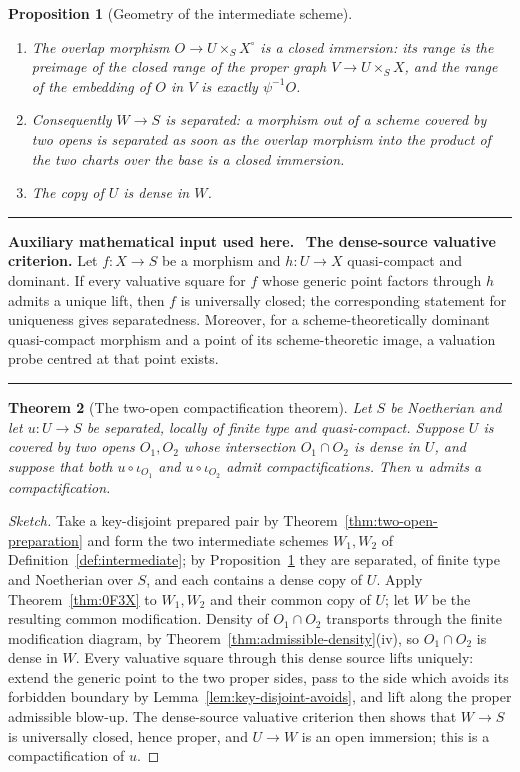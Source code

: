 \documentclass[11pt,a4paper]{article}
\theoremstyle{plain}
\newtheorem{theorem}{Theorem}[section]
\newtheorem{proposition}[theorem]{Proposition}
\theoremstyle{definition}
\theoremstyle{remark}
\newenvironment{auxinput}{%
  \par\medskip\begingroup\interlinepenalty=10000\relax
  \noindent\textcolor{orange!70!black}{\rule{\linewidth}{0.9pt}}%
  \par\nopagebreak\smallskip\noindent
  \textbf{Auxiliary mathematical input used here.}\ \ignorespaces}%
  {\par\nopagebreak\smallskip\nopagebreak\noindent
   \textcolor{orange!70!black}{\rule{\linewidth}{0.9pt}}\par\endgroup\medskip}
\begin{document}
\begin{proposition}[Geometry of the intermediate scheme]
\label{prop:intermediate}
\begin{enumerate}[label=\textup{(\roman*)}, itemsep=1pt]
\item The overlap morphism $O\to U\times_S X^{\circ}$ is a closed immersion:
      its range is the preimage of the closed range of the proper graph
      $V\to U\times_S X$, and the range of the embedding of $O$ in $V$ is
      exactly $\psi^{-1}O$.
\item Consequently $W\to S$ is separated: a morphism out of a scheme covered by
      two opens is separated as soon as the overlap morphism into the product of
      the two charts over the base is a closed immersion.
\item The copy of $U$ is dense in $W$.
\end{enumerate}
\end{proposition}

\begin{auxinput}
\textbf{The dense-source valuative criterion.} Let $f\colon X\to S$ be a
morphism and $h\colon U\to X$ quasi-compact and dominant. If every valuative
square for $f$ whose generic point factors through $h$ admits a unique lift,
then $f$ is universally closed; the corresponding statement for uniqueness
gives separatedness. Moreover, for a scheme-theoretically dominant
quasi-compact morphism and a point of its scheme-theoretic image, a valuation
probe centred at that point exists.
\end{auxinput}

\begin{theorem}[The two-open compactification theorem]
\label{thm:two-open}
Let $S$ be Noetherian and let $u\colon U\to S$ be separated, locally of finite
type and quasi-compact. Suppose $U$ is covered by two opens $O_1,O_2$ whose
intersection $O_1\cap O_2$ is dense in $U$, and suppose that both
$u\circ\iota_{O_1}$ and $u\circ\iota_{O_2}$ admit compactifications. Then $u$
admits a compactification.
\end{theorem}

\begin{proof}[Sketch]
Take a key-disjoint prepared pair by Theorem~\ref{thm:two-open-preparation} and
form the two intermediate schemes $W_1,W_2$ of Definition~\ref{def:intermediate};
by Proposition~\ref{prop:intermediate} they are separated, of finite type and
Noetherian over $S$, and each contains a dense copy of $U$. Apply
Theorem~\ref{thm:0F3X} to $W_1,W_2$ and their common copy of $U$; let $W$ be the
resulting common modification. Density of $O_1\cap O_2$ transports through the
finite modification diagram, by Theorem~\ref{thm:admissible-density}(iv), so
$O_1\cap O_2$ is dense in $W$. Every valuative square through this dense source
lifts uniquely: extend the generic point to the two proper sides, pass to the
side which avoids its forbidden boundary by
Lemma~\ref{lem:key-disjoint-avoids}, and lift along the proper admissible
blow-up. The dense-source valuative criterion then shows that $W\to S$ is
universally closed, hence proper, and $U\to W$ is an open immersion; this is a
compactification of $u$.
\end{proof}
\end{document}
